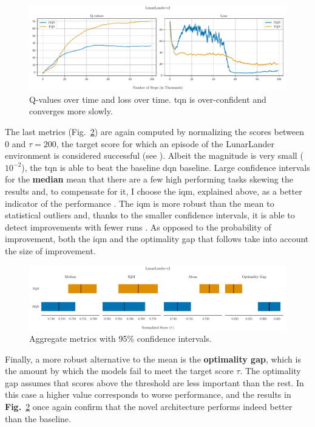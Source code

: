 \begin{figure}[!htbp]
\centering
\includegraphics[width=\textwidth]{images/q-vs-loss_DQN-TQN_LunarLander-v2.pdf}
\caption{Q-values over time and loss over time. \acrshort{tqn} is over-confident and converges more slowly.}
\label{fig:q-vs-loss-LunarLander-v2}
\end{figure}

The last metrics (Fig.~\ref{fig:statistics-LunarLander-v2}) are again computed by normalizing the scores between $0$ and $\tau = 200$, the target score for which an episode of the LunarLander environment is considered successful (see ). Albeit the magnitude is very small ($10^{-2}$), the \acrlong{tqn} is able to beat the baseline \acrshort{dqn} baseline. Large confidence intervals for the \textbf{median} mean that there are a few high performing tasks skewing the results and, to compensate for it, I choose the \acrshort{iqm}, explained above, as a better indicator of the performance \cite{rliable}. The \acrshort{iqm} is more robust than the mean to statistical outliers and, thanks to the smaller confidence intervals, it is able to detect improvements with fewer runs \cite{rliable}. As opposed to the probability of improvement, both the \acrshort{iqm} and the optimality gap that follows take into account the size of improvement.

\begin{figure}[!htbp]
\centering
\includegraphics[width=\textwidth]{images/statistics_DQN-TQN_LunarLander-v2.pdf}
\caption{Aggregate metrics with 95\% confidence intervals.}
\label{fig:statistics-LunarLander-v2}
\end{figure}

Finally, a more robust alternative to the mean is the \textbf{optimality gap}, which is the amount by which the models fail to meet the target score $\tau$. The optimality gap assumes that scores above the threshold are less important than the rest. In this case a higher value corresponds to worse performance, and the results in \textbf{Fig.}~\ref{fig:statistics-LunarLander-v2} once again confirm that the novel architecture performs indeed better than the baseline.
